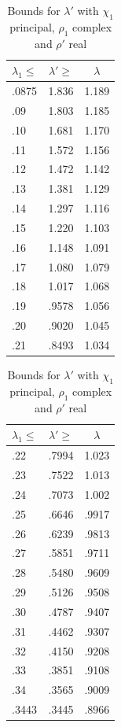 \documentclass[12pt,psamsfonts]{amsart}
\theoremstyle{definition}
\theoremstyle{remark}
\numberwithin{equation}{section}
\begin{document}
\begin{table}
\begin{tabular}{l|c|c} 
$\lambda_1 \leq$ & $\lambda' \geq$ & $\lambda$ \\ 
 \hline 
 .0875 &  1.836 &  1.189 \\ 
 .09 &  1.803 &  1.185 \\ 
 .10 &  1.681 &  1.170 \\ 
 .11 &  1.572 &  1.156 \\ 
 .12 &  1.472 &  1.142 \\ 
 .13 &  1.381 &  1.129 \\ 
 .14 &  1.297 &  1.116 \\ 
 .15 &  1.220 &  1.103 \\ 
 .16 &  1.148 &  1.091 \\ 
 .17 &  1.080 &  1.079 \\ 
 .18 &  1.017 &  1.068 \\ 
 .19 &  .9578 &  1.056 \\ 
 .20 &  .9020 &  1.045 \\ 
 .21 &  .8493 &  1.034 \\ 
 \end{tabular}
 \qquad
 \begin{tabular}{l|c|c} 
$\lambda_1 \leq$ & $\lambda' \geq$ & $\lambda$ \\ 
 \hline
 .22 &  .7994 &  1.023 \\ 
 .23 &  .7522 &  1.013 \\ 
 .24 &  .7073 &  1.002 \\ 
 .25 &  .6646 &  .9917 \\ 
 .26 &  .6239 &  .9813 \\ 
 .27 &  .5851 &  .9711 \\ 
 .28 &  .5480 &  .9609 \\ 
 .29 &  .5126 &  .9508 \\ 
 .30 &  .4787 &  .9407 \\ 
 .31 &  .4462 &  .9307 \\ 
 .32 &  .4150 &  .9208 \\ 
 .33 &  .3851 &  .9108 \\ 
 .34 &  .3565 &  .9009 \\ 
 .3443 &  .3445 &  .8966 \\ 
\end{tabular}


\caption{Bounds for $\lambda'$ with $\chi_1$ principal, $\rho_1$ complex and $\rho'$ real}
\label{Table-Lp-CC_Chi1Principal_RhopReal}
\end{table}
\end{document}
